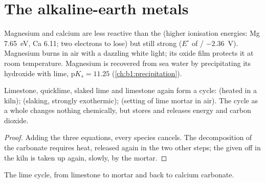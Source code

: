 \section{The alkaline-earth metals}

Magnesium and calcium are less reactive than the  (higher
ionisation energies: Mg \qty{7.65}{eV}, Ca 6.11; two electrons to lose) but
still strong  ($E^\circ$ of / $-2.36$~V).
Magnesium burns in air with a dazzling white light; its oxide film
protects it at room temperature. Magnesium is recovered from sea water by
precipitating its hydroxide with lime, $\mathrm{p}K_s = 11.25$
(\cref{ch:b1:precipitation}).

\begin{proposition}\label{prop:b1:s-block:lime-cycle}
Limestone, quicklime, slaked lime and limestone again form a cycle:
 (heated in a kiln); 
(slaking, strongly exothermic);  (setting
of lime mortar in air). The cycle as a whole changes nothing chemically,
but stores and releases energy and carbon dioxide.
\end{proposition}

\begin{proof}
Adding the three equations, every species cancels. The decomposition of
the carbonate requires heat, released again in the two other steps; the
 given off in the kiln is taken up again, slowly, by the mortar.
\end{proof}

\begin{omfigure}

{\small The lime cycle, from limestone to mortar and back to calcium
carbonate.}
\end{omfigure}

